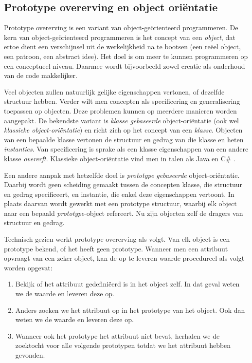 \subsection{Prototype overerving en object oriëntatie}
\label{sec:taal-prototypen}

Prototype overerving is een variant van object-geörienteerd programmeren. De kern van object-geörienteerd programmeren is het concept van een \emph{object}, dat ertoe dient een verschijnsel uit de werkelijkheid na te bootsen (een reëel object, een patroon, een abstract idee). Het doel is om meer te kunnen programmeren op een conceptueel niveau. Daarmee wordt bijvoorbeeld zowel creatie als onderhoud van de code makkelijker.

Veel objecten zullen natuurlijk gelijke eigenschappen vertonen, of dezelfde structuur hebben. Verder wilt men concepten als specificering en generalisering toepassen op objecten. Deze problemen kunnen op meerdere manieren worden aangepakt. De bekendste variant is \emph{klasse gebaseerde} object-oriëntatie (ook wel \emph{klassieke object-oriëntatie}) en richt zich op het concept van een \emph{klasse}. Objecten van een bepaalde klasse vertonen de structuur en gedrag van die klasse en heten \emph{instanties}. Van specificering is sprake als een klasse eigenschappen van een andere klasse \emph{overerft}. Klassieke object-oriëntatie vind men in talen als Java en C\# \citep{java,csharp}.

Een andere aanpak met hetzelfde doel is \emph{prototype gebaseerde} object-oriëntatie. Daarbij wordt geen scheiding gemaakt tussen de concepten klasse, die structuur en gedrag specificeert, en instantie, die enkel deze eigenschappen vertoont. In plaats daarvan wordt gewerkt met een prototype structuur, waarbij elk object naar een bepaald \emph{prototype}-object refereert. Nu zijn objecten zelf de dragers van structuur en gedrag.

Technisch gezien werkt prototype overerving als volgt. Van elk object is een prototype bekend, of het heeft geen prototype. Wanneer men een attribuut opvraagt van een zeker object, kan de op te leveren waarde procedureel als volgt worden opgevat:

\begin{enumerate}
  \item Bekijk of het attribuut gedefiniëerd is in het object zelf. In dat geval weten we de waarde en leveren deze op.
  \item Anders zoeken we het attribuut op in het prototype van het object. Ook dan weten we de waarde en leveren deze op.
  \item Wanneer ook het prototype het attribuut niet bevat, herhalen we de zoektocht voor alle volgende prototypen totdat we het attribuut hebben gevonden.
\end{enumerate}

